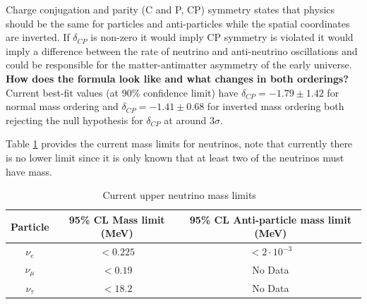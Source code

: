 Charge conjugation and parity (C and P, CP) symmetry states that physics should be the same for particles and anti-particles while the spatial coordinates are inverted. If $\delta_{CP}$ is non-zero it would imply CP symmetry is violated it would imply a difference between the rate of neutrino and anti-neutrino oscillations and could be responsible for the matter-antimatter asymmetry of the early universe.\textbf{ How does the formula look like and what changes in both orderings?} Current best-fit values (at 90\% confidence limit) have $\delta_{CP} = -1.79\pm 1.42$ for normal mass ordering and $\delta_{CP} = -1.41\pm 0.68$ for inverted mass ordering both rejecting the null hypothesis for $\delta_{CP}$ at around $3\sigma$\cite{T2KResults}.



Table \ref{table:UpperNMass} provides the current mass limits for neutrinos, note that currently there is no lower limit since it is only known that at least two of the neutrinos must have mass.

\begin {table}[H]
\begin{center}
\begin{tabular}{ |c|c|c| } 
 \hline
 Particle & 95\% CL Mass limit (MeV) & 95\% CL Anti-particle mass limit (MeV) \\ 
  \hline
 $\nu_e$ & $<0.225$ & $<2 \cdot 10^{-3}$ \\ 
 $\nu_\mu$ & $<0.19$ & No Data \\ 
  $\nu_\tau$ & $< 18.2$ & No Data \\ 
 \hline

\end{tabular}
\end{center}
\caption{Current upper neutrino mass limits ~\cite{13PDG}}
\label{table:UpperNMass}
\end {table}

